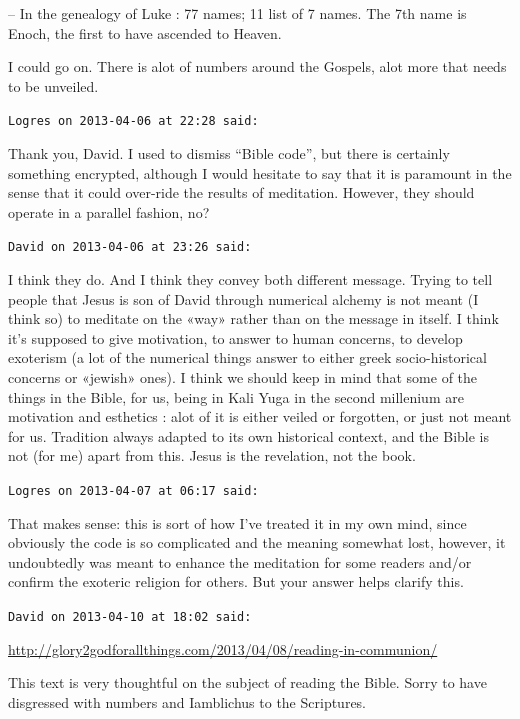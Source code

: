 \begin{footnotesize}
\begin{sffamily}
-- In the genealogy of Luke : 77 names; 11 list of 7 names. The 7th name is Enoch, the first to have ascended to Heaven.

I could go on. There is alot of numbers around the Gospels, alot more that needs to be unveiled.

\hfill

\texttt{Logres on 2013-04-06 at 22:28 said:}

Thank you, David. I used to dismiss ``Bible code'', but there is certainly something encrypted, although I would hesitate to say that it is paramount in the sense that it could over-ride the results of meditation. However, they should operate in a parallel fashion, no?

\hfill

\texttt{David on 2013-04-06 at 23:26 said:}

I think they do. And I think they convey both different message. Trying to tell people that Jesus is son of David through numerical alchemy is not meant (I think so) to meditate on the «way» rather than on the message in itself. I think it's supposed to give motivation, to answer to human concerns, to develop exoterism (a lot of the numerical things answer to either greek socio-historical concerns or «jewish» ones). I think we should keep in mind that some of the things in the Bible, for us, being in Kali Yuga in the second millenium are motivation and esthetics : alot of it is either veiled or forgotten, or just not meant for us. Tradition always adapted to its own historical context, and the Bible is not (for me) apart from this. Jesus is the revelation, not the book.

\hfill

\texttt{Logres on 2013-04-07 at 06:17 said:}

That makes sense: this is sort of how I've treated it in my own mind, since obviously the code is so complicated and the meaning somewhat lost, however, it undoubtedly was meant to enhance the meditation for some readers and/or confirm the exoteric religion for others. But your answer helps clarify this.

\hfill

\texttt{David on 2013-04-10 at 18:02 said:}

\url{http://glory2godforallthings.com/2013/04/08/reading-in-communion/}


This text is very thoughtful on the subject of reading the Bible. Sorry to have disgressed with numbers and Iamblichus to the Scriptures.

\end{sffamily}
\end{footnotesize}

